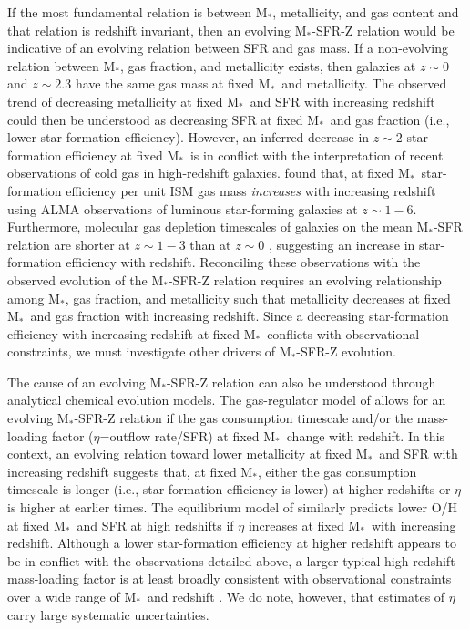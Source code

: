 \documentclass[iop,twocolappendix]{emulateapj}
\newcommand{\mstar}{$\mbox{M}_*$}
\begin{document}
If the most fundamental relation is between \mstar, metallicity, and gas content and that relation is redshift invariant,
 then an evolving \mstar-SFR-Z relation would be indicative of an evolving relation between SFR and gas mass.
  If a non-evolving relation between \mstar, gas fraction, and metallicity exists, then
 galaxies at $z\sim0$ and $z\sim2.3$ have the same gas mass at fixed \mstar\ and metallicity.
  The observed trend of decreasing metallicity at fixed \mstar\ and SFR with increasing redshift
 could then be understood as decreasing SFR at fixed \mstar\ and gas fraction (i.e., lower star-formation efficiency).
  However, an inferred decrease in $z\sim2$ star-formation efficiency at fixed \mstar\ is in conflict
 with the interpretation of recent observations of cold gas in high-redshift galaxies.
  \citet{sco16,sco17} found that, at fixed \mstar\, star-formation efficiency per unit ISM gas mass \textit{increases}
 with increasing redshift using ALMA observations of luminous star-forming galaxies at $z\sim1-6$.
  Furthermore, molecular gas depletion timescales of galaxies on the mean \mstar-SFR relation are shorter
 at $z\sim1-3$ than at $z\sim0$ \citep{tac13,gen15}, suggesting an increase in star-formation efficiency
 with redshift.  Reconciling these observations with the observed evolution of the \mstar-SFR-Z relation
 requires an evolving relationship among \mstar, gas fraction, and metallicity
 such that metallicity decreases at fixed \mstar\ and gas fraction with increasing redshift.
  Since a decreasing star-formation efficiency with increasing redshift at fixed \mstar\
 conflicts with observational constraints, we must investigate other drivers of \mstar-SFR-Z evolution.

The cause of an evolving \mstar-SFR-Z relation can also be understood through analytical chemical evolution models.
  The gas-regulator model of \citet{lil13} allows for an evolving \mstar-SFR-Z relation
 if the gas consumption timescale and/or the mass-loading factor ($\eta$=outflow rate/SFR)
 at fixed \mstar\ change with redshift.
  In this context, an evolving relation toward lower metallicity at fixed \mstar\ and SFR
 with increasing redshift suggests that, at fixed \mstar, either the gas consumption timescale is longer
 (i.e., star-formation efficiency is lower) at higher redshifts or $\eta$ is higher
 at earlier times.
  The equilibrium model of \citet{dav12} similarly predicts lower O/H at fixed \mstar\ and SFR
 at high redshifts if $\eta$ increases at fixed \mstar\ with increasing redshift.
  Although a lower star-formation efficiency at higher redshift appears to be in conflict with the
 observations detailed above, a larger typical high-redshift mass-loading factor is at least broadly
 consistent with observational constraints over a wide range of \mstar\ and redshift
 \citep[e.g.,][]{pet02,rup05,wei09,ste10,hec15,chi17}.
  We do note, however, that estimates of $\eta$ carry large systematic uncertainties.
\end{document}
